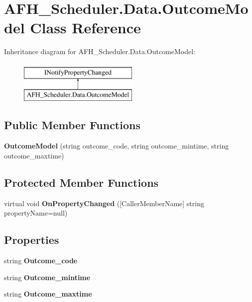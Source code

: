 \section{A\+F\+H\+\_\+\+Scheduler.\+Data.\+Outcome\+Model Class Reference}
\label{class_a_f_h___scheduler_1_1_data_1_1_outcome_model}
Inheritance diagram for A\+F\+H\+\_\+\+Scheduler.\+Data.\+Outcome\+Model\+:\begin{figure}[H]
\begin{center}
\leavevmode
\includegraphics[height=2.000000cm]{class_a_f_h___scheduler_1_1_data_1_1_outcome_model}
\end{center}
\end{figure}
\subsection*{Public Member Functions}
\begin{DoxyCompactItemize}
\item 
\mbox{\label{class_a_f_h___scheduler_1_1_data_1_1_outcome_model_a555c7b4d84ebd2f93048d04e4dc30f62}} 
{\bfseries Outcome\+Model} (string outcome\+\_\+code, string outcome\+\_\+mintime, string outcome\+\_\+maxtime)
\end{DoxyCompactItemize}
\subsection*{Protected Member Functions}
\begin{DoxyCompactItemize}
\item 
\mbox{\label{class_a_f_h___scheduler_1_1_data_1_1_outcome_model_a522ab3276417a0e8b779313c6157ea47}} 
virtual void {\bfseries On\+Property\+Changed} ([Caller\+Member\+Name] string property\+Name=null)
\end{DoxyCompactItemize}
\subsection*{Properties}
\begin{DoxyCompactItemize}
\item 
\mbox{\label{class_a_f_h___scheduler_1_1_data_1_1_outcome_model_a66683c656102b4153dd5b991bfc5c3bf}} 
string {\bfseries Outcome\+\_\+code}\hspace{0.3cm}{\ttfamily  [get, set]}
\item 
\mbox{\label{class_a_f_h___scheduler_1_1_data_1_1_outcome_model_a94315d15e5ad2b7c9df9a297223cf6ba}} 
string {\bfseries Outcome\+\_\+mintime}\hspace{0.3cm}{\ttfamily  [get, set]}
\item 
\mbox{\label{class_a_f_h___scheduler_1_1_data_1_1_outcome_model_abaf851328b1cc3f8232881f06de45afa}} 
string {\bfseries Outcome\+\_\+maxtime}\hspace{0.3cm}{\ttfamily  [get, set]}
\end{DoxyCompactItemize}
